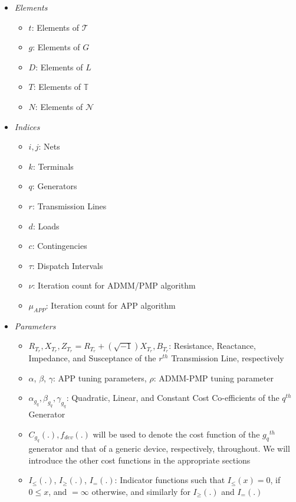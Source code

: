 \documentclass[preprint,12pt,3p]{elsarticle}
\begin{document}
\begin{itemize}
\begin{itemize}[label={}]
    \end{itemize}
    \item \textit{Elements}
    \begin{itemize}[label={}]
        \item $t$: Elements of $\mathcal{T}$
        \item $g$: Elements of $G$
        \item $D$: Elements of $L$
        \item $T$: Elements of $\mathbb{T}$
        \item $N$: Elements of $\mathcal{N}$
    \end{itemize}
    \item \textit{Indices}
    \begin{itemize}[label={}]
        \item $i,j$: Nets
        \item $k$: Terminals
        \item $q$: Generators
        \item $r$: Transmission Lines
        \item $d$: Loads
        \item $c$: Contingencies
        \item $\tau$: Dispatch Intervals
        \item $\nu$: Iteration count for ADMM/PMP algorithm
        \item $\mu_{APP}$: Iteration count for APP algorithm
    \end{itemize}
    \item \textit{Parameters}
    \begin{itemize}[label={}]
        \item $R_{T_r}, X_{T_r}, Z_{T_r}=R_{T_r}+(\sqrt{-1})X_{T_r},  B_{T_r}$: Resistance, Reactance, Impedance, and Susceptance of the $r^{th}$ Transmission Line, respectively
        \item $\alpha$, $\beta$, $\gamma$: APP tuning parameters, $\rho$: ADMM-PMP tuning parameter
        \item $\alpha_{g_q}, \beta_{g_q}, \gamma_{g_q}$: Quadratic, Linear, and Constant Cost Co-efficients of the $q^{th}$ Generator
        \item $C_{g_q}(.), f_{dev}(.)$ will be used to denote the cost function of the ${g_q}^{th}$ generator and that of a generic device, respectively, throughout. We will introduce the other cost functions in the appropriate sections
        \item $I_{\leq}(.)$, $I_{\geq}(.)$, $ I_{=}(.)$: Indicator functions such that $I_{\leq}(x)=0$, if $0\leq x$, and $=\infty$ otherwise, and similarly for $I_{\geq}(.)$ and $ I_{=}(.)$ 

\end{itemize}
\end{itemize}
\end{document}
